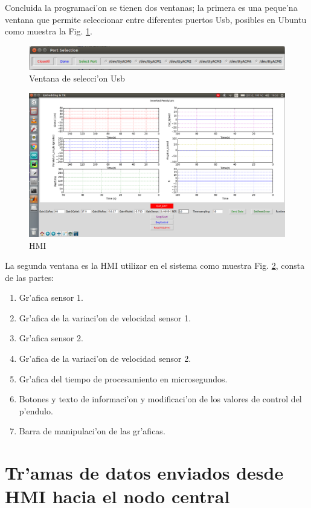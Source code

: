 Concluida la programaci'on se tienen dos ventanas; la primera es una peque'na ventana que permite seleccionar entre diferentes puertos Usb, posibles en Ubuntu  como muestra la Fig. \ref{fig:usb}.
\begin{figure}[ht]
	\centering
		\includegraphics[scale=0.6]{usb}
	\caption{Ventana de selecci'on Usb}
	\label{fig:usb}
\end{figure}
\begin{figure}[ht]
	\centering
		\includegraphics[scale=0.45]{HMI}
	\caption{HMI}
	\label{fig:HMI}
\end{figure}

La segunda ventana es la HMI utilizar en el sistema como muestra Fig. \ref{fig:HMI}, consta de las partes:

\begin{enumerate}
	\item Gr'afica sensor 1.
	\item Gr'afica de la variaci'on de velocidad sensor 1.
	\item Gr'afica sensor 2.
	\item Gr'afica de la variaci'on de velocidad sensor 2.
	\item Gr'afica del tiempo de procesamiento en microsegundos.
	\item Botones y texto de informaci'on y modificaci'on de los valores de control del p'endulo.
	\item Barra de manipulaci'on de las gr'aficas.
\end{enumerate}


\section{Tr'amas de datos enviados desde HMI hacia el nodo central}

